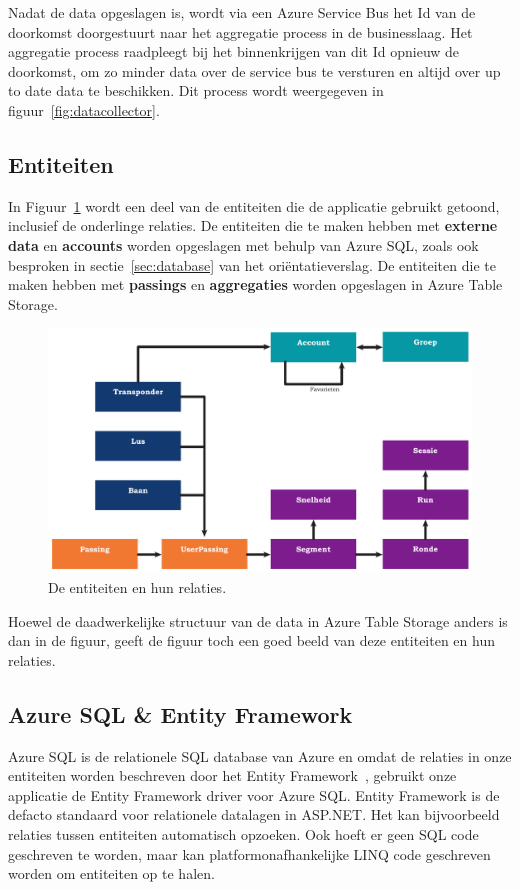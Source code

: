 Nadat de data opgeslagen is, wordt via een Azure Service Bus het Id van de doorkomst doorgestuurt naar het aggregatie process in de businesslaag. Het aggregatie process raadpleegt bij het binnenkrijgen van dit Id opnieuw de doorkomst, om zo minder data over de service bus te versturen en altijd over up to date data te beschikken. Dit process wordt weergegeven in figuur~\ref{fig:datacollector}.

\subsection{Entiteiten}
In Figuur~\ref{fig:entiteiten} wordt een deel van de entiteiten die de applicatie gebruikt getoond, inclusief de onderlinge relaties. De entiteiten die te maken hebben met {\bfseries\color{tudelft-dark-blue} externe data} en {\bfseries\color{tudelft-green} accounts} worden opgeslagen met behulp van Azure SQL, zoals ook besproken in sectie~\ref{sec:database} van het oriëntatieverslag. De entiteiten die te maken hebben met {\bfseries\color{tudelft-orange} passings} en {\bfseries\color{tudelft-warm-purple} aggregaties} worden opgeslagen in Azure Table Storage.

\begin{figure}[ht]
  \begin{center}
  \includegraphics[width=.6\textwidth]{style/images/Entiteiten}    
  \end{center}
  \caption{De entiteiten en hun relaties.}
  \label{fig:entiteiten}
\end{figure}

Hoewel de daadwerkelijke structuur van de data in Azure Table Storage anders is dan in de figuur, geeft de figuur toch een goed beeld van deze entiteiten en hun relaties. 

\subsection{Azure SQL \& Entity Framework}
Azure SQL is de relationele SQL database van Azure en omdat de relaties in onze entiteiten worden beschreven door het Entity Framework~\cite{entityframework-msdn, entityframework-facto}, gebruikt onze applicatie de Entity Framework driver voor Azure SQL. Entity Framework is de defacto standaard voor relationele datalagen in ASP.NET. Het kan bijvoorbeeld relaties tussen entiteiten automatisch opzoeken. Ook hoeft er geen SQL code geschreven te worden, maar kan platformonafhankelijke LINQ code geschreven worden om entiteiten op te halen.

